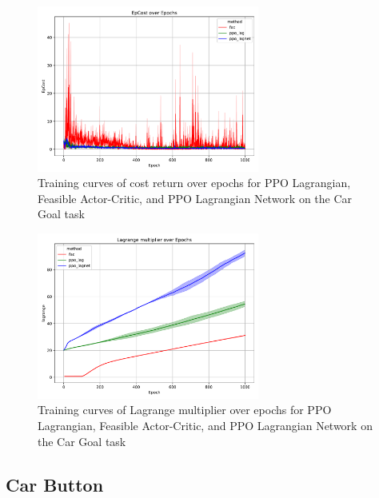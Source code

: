 \begin{figure}[h]
  \centering
  \includegraphics[width=0.65\textwidth]{imgs/chap4/car_goal/cost.pdf}
  \caption{Training curves of cost return over epochs for PPO Lagrangian, Feasible Actor-Critic, and PPO Lagrangian Network on the Car Goal task}
  \label{chap4:fig:car_goal_cost}
\end{figure}

\clearpage

\begin{figure}[t]
  \centering
  \includegraphics[width=0.65\textwidth]{imgs/chap4/car_goal/lagrange.pdf}
  \caption{Training curves of Lagrange multiplier over epochs for PPO Lagrangian, Feasible Actor-Critic, and PPO Lagrangian Network on the Car Goal task}
  \label{chap4:fig:car_goal_lagrange}
\end{figure}


\subsection{Car Button}

